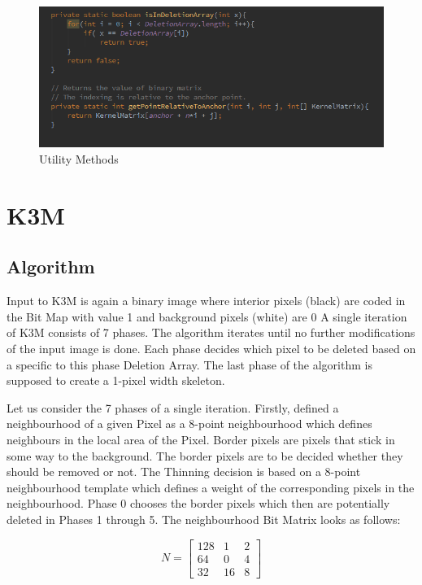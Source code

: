 \documentclass{article}
\begin{document}
%
%
\begin{figure}[H]
\centering

  \includegraphics[width=0.9\linewidth]{res/kmm/util.png}

\caption{Utility Methods}
\label{fig:kmm_util}
\end{figure}

\section{K3M}

\subsection{Algorithm}

Input to K3M is again a binary image where interior pixels (black) are coded in the Bit Map with value 1 and background pixels (white) are 0
A single iteration of K3M consists of 7 phases. The algorithm iterates until no further modifications of the input image is done. Each phase decides which pixel to be deleted based on a specific to this phase Deletion Array. The last phase of the algorithm is supposed to create a 1-pixel width skeleton. 

Let us consider the 7 phases of a single iteration. Firstly, defined a neighbourhood of a given Pixel as a 8-point neighbourhood which defines neighbours in the local area of the Pixel. Border pixels are pixels that stick in some way to the background. The border pixels are to be decided whether they should be removed or not. The Thinning decision is based on a 8-point neighbourhood template which defines a weight of the corresponding pixels in the neighbourhood. Phase 0 chooses the border pixels which then are potentially deleted in Phases 1 through 5.
The neighbourhood Bit Matrix looks as follows:

\[
N =
\begin{bmatrix}
	128 & 1  & 2 \\
	64  & 0  & 4 \\
	32  & 16 & 8
\end{bmatrix}
\]
\end{document}
